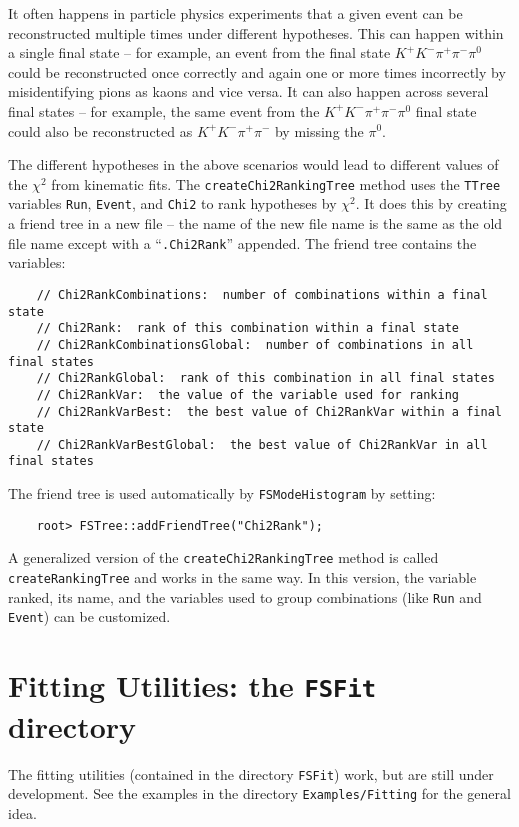 \documentclass[11pt]{article}
\begin{document}
It often happens in particle physics experiments that a given event can be reconstructed multiple times under different hypotheses.  This can happen within a single final state -- for example, an event from the final state $K^+K^-\pi^+\pi^-\pi^0$ could be reconstructed once correctly and again one or more times incorrectly by misidentifying pions as kaons and vice versa.  It can also happen across several final states -- for example, the same event from the $K^+K^-\pi^+\pi^-\pi^0$ final state could also be reconstructed as $K^+K^-\pi^+\pi^-$ by missing the $\pi^0$.  

The different hypotheses in the above scenarios would lead to different values of the $\chi^2$ from kinematic fits.  The {\tt createChi2RankingTree} method uses the {\tt TTree} variables {\tt Run}, {\tt Event}, and {\tt Chi2} to rank hypotheses by $\chi^2$.  It does this by creating a friend tree in a new file -- the name of the new file name is the same as the old file name except with a ``{\tt .Chi2Rank}'' appended.  The friend tree contains the variables:
\begin{verbatim}
    // Chi2RankCombinations:  number of combinations within a final state
    // Chi2Rank:  rank of this combination within a final state
    // Chi2RankCombinationsGlobal:  number of combinations in all final states
    // Chi2RankGlobal:  rank of this combination in all final states
    // Chi2RankVar:  the value of the variable used for ranking
    // Chi2RankVarBest:  the best value of Chi2RankVar within a final state
    // Chi2RankVarBestGlobal:  the best value of Chi2RankVar in all final states
\end{verbatim}
The friend tree is used automatically by {\tt FSModeHistogram} by setting:
\begin{verbatim}
    root> FSTree::addFriendTree("Chi2Rank");
\end{verbatim}
A generalized version of the {\tt createChi2RankingTree} method is called {\tt createRankingTree} and works in the same way.  In this version, the variable ranked, its name, and the variables used to group combinations (like {\tt Run} and {\tt Event}) can be customized.


\section{Fitting Utilities:  the {\tt FSFit} directory}

The fitting utilities (contained in the directory {\tt FSFit}) work, but are still under development.  See the examples in the directory {\tt Examples/Fitting} for the general idea.
\end{document}
